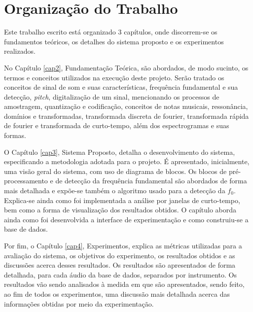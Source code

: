 \section{Organização do Trabalho}

Este trabalho escrito está organizado 3 capítulos, onde discorrem-se os fundamentos teóricos, os detalhes do sistema proposto e os experimentos realizados.


No Capítulo \ref{cap2}, Fundamentação Teórica, são abordados, de modo sucinto, os termos e conceitos utilizados na execução deste projeto. Serão tratado os conceitos de sinal de som e suas características, frequência fundamental e sua detecção, \textit{pitch}, digitalização de um sinal, mencionando os processos de amostragem, quantização e codificação, conceitos de notas musicais, ressonância, domínios e transformadas, transformada discreta de fourier, transformada rápida de fourier e transformada de curto-tempo, além dos espectrogramas e suas formas.


O Capítulo \ref{cap3}, Sistema Proposto, detalha o desenvolvimento do sistema, especificando a metodologia adotada para o projeto. É apresentado, inicialmente, uma visão geral do sistema, com uso de diagrama de blocos. Os blocos de pré-processamento e de detecção da frequência fundamental são abordados de forma mais detalhada e expõe-se também o algoritmo usado para a detecção da $f_0$. Explica-se ainda como foi implementada a análise por janelas de curto-tempo, bem como a forma de visualização dos resultados obtidos. O capítulo aborda ainda como foi desenvolvida a interface de experimentação e como construiu-se a base de dados.


Por fim, o Capítulo \ref{cap4}, Experimentos, explica as métricas utilizadas para a avaliação do sistema, os objetivos do experimento, os resultados obtidos e as discussões acerca desses resultados. Os resultados são apresentados de forma detalhada, para cada áudio da base de dados, separados por instrumento. Os resultados vão sendo analisados à medida em que são apresentados, sendo feito, ao fim de todos os experimentos, uma discussão mais detalhada acerca das informações obtidas por meio da experimentação.



